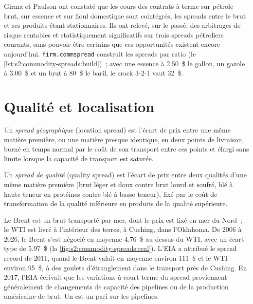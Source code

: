 Girma et Paulson ont constaté que les cours des contrats à terme sur pétrole brut, sur essence et sur fioul domestique sont cointégrés, les spreads entre le brut et ses produits étant stationnaires. Ils
ont relevé, sur le passé, des arbitrages de risque rentables et statistiquement significatifs sur trois spreads pétroliers courants, sans pouvoir être certains que
ces opportunités existent encore aujourd'hui. \texttt{firm.commspread} construit les spreads par ratio
(le \cref{lst:s2:commodity-spreads:build})~; avec une essence à 2.50~\$ le gallon, un gazole à 3.00~\$ et un brut à 80~\$ le baril, le crack 3-2-1 vaut 32~\$.

\section{Qualité et localisation}

\begin{definition}\label{def:s2:commodity-spreads:location}
Un \emph{spread géographique} (location spread) est l'écart de prix entre une même matière première, ou une matière presque identique, en deux points de livraison, borné
en temps normal par le coût de son transport entre ces points et élargi sans limite lorsque la capacité de transport est saturée.
\end{definition}

\begin{definition}\label{def:s2:commodity-spreads:quality}
Un \emph{spread de qualité} (quality spread) est l'écart de prix entre deux qualités d'une même matière première (brut léger et doux contre brut lourd et soufré,
blé à haute teneur en protéines contre blé à basse teneur), fixé par le coût de transformation de la qualité inférieure en produits de la qualité supérieure.
\end{definition}

Le Brent est un brut transporté par mer, dont le prix est fixé en mer du Nord~; le WTI est livré à l'intérieur des terres, à Cushing, dans l'Oklahoma. De 2006 à 2026, le Brent s'est négocié en moyenne 4.76~\$
au-dessus du WTI, avec un écart type de 5.97~\$ (la \cref{fig:s2:commodity-spreads:real}). L'EIA a attribué le spread record de 2011, quand le Brent
valait en moyenne environ 111~\$ et le WTI environ 95~\$, à des goulets d'étranglement dans le transport près de Cushing. En 2017, l'EIA écrivait que les variations à court terme du spread
proviennent généralement de changements de capacité des pipelines ou de la production américaine de brut. Un  est un pari sur les pipelines.

